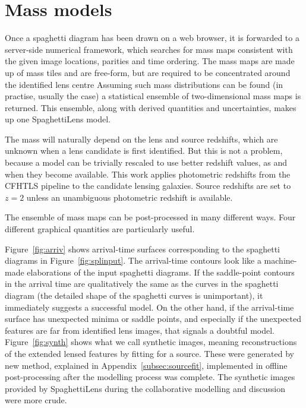 \section{Mass models}\label{sec:massmodels}

Once a spaghetti diagram has been drawn on a web browser, it is
forwarded to a server-side numerical framework, which searches for
mass maps consistent with the given image locations, parities and time
ordering.  The mass maps are made up of mass tiles and are free-form,
but are required to be concentrated around the identified lens centre
\citep[see][for the precise formulation of the search
  problem.]{2014MNRAS.445.2181C} Assuming such mass distributions can
be found (in practise, usually the case) a statistical ensemble of
two-dimensional mass maps is returned.  This ensemble, along with
derived quantities and uncertainties, makes up one SpaghettiLens
model.

The mass will naturally depend on the lens and source redshifts, which
are unknown when a lens candidate is first identified.  But this is
not a problem, because a model can be trivially rescaled to use better
redshift values, as and when they become available.  This work applies
photometric redshifts from the CFHTLS pipeline to the candidate
lensing galaxies.  Source redshifts are set to $z=2$ unless an
unambiguous photometric redshift is available.

The ensemble of mass maps can be post-processed in many different
ways.  Four different graphical quantities are particularly useful.

Figure~\ref{fig:arriv} shows arrival-time surfaces corresponding to
the spaghetti diagrams in Figure~\ref{fig:splinput}.  The arrival-time
contours look like a machine-made elaborations of the input spaghetti
diagrams.  If the saddle-point contours in the arrival time are
qualitatively the same as the curves in the spaghetti diagram (the
detailed shape of the spaghetti curves is unimportant), it immediately
suggests a successful model.  On the other hand, if the arrival-time
surface has unexpected minima or saddle points, and especially if the
unexpected features are far from identified lens images, that signals
a doubtful model.  Figure~\ref{fig:synth} shows what we call synthetic
images, meaning reconstructions of the extended lensed features by
fitting for a source.  These were generated by new method, explained
in Appendix~\ref{subsec:sourcefit}, implemented in offline
post-processing after the modelling process was complete.  The
synthetic images provided by SpaghettiLens during the collaborative
modelling and discussion were more crude.

